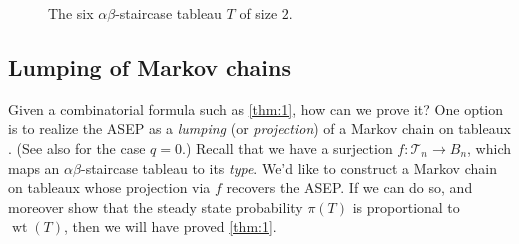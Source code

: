 \documentclass[11pt]{amsart}
\DeclareMathOperator{\wt}{wt}
\theoremstyle{definition}
\theoremstyle{remark}
\begin{document}
\begin{figure}[h]
{
	\hspace{1cm}
}
\caption{The six $\alpha\beta$-staircase tableau $T$
	of size $2$.} %
	\label{fig:4}
\end{figure}

\subsection{Lumping of Markov chains}
Given  a combinatorial formula such as \cref{thm:1}, how can we prove it? 
One option is to realize the ASEP as a \emph{lumping} (or \emph{projection}) of 
a Markov chain on tableaux \cite{CW2}.
(See also \cite{DS} for the case $q=0$.)
Recall that 
we have a surjection
$f:\mathcal{T}_n \to B_n$, which maps an 
 $\alpha \beta$-staircase tableau
to its \emph{type}.
We'd like to construct a Markov chain
on tableaux whose projection via $f$ recovers the ASEP.
If we can do so, and moreover show that 
	  the steady state probability $\pi(T)$
		is proportional to $\wt(T)$, then 
		we will have proved \cref{thm:1}.


\end{document}
